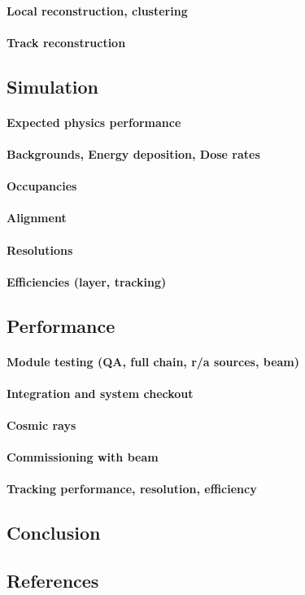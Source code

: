 \paragraph{Local reconstruction, clustering}
\paragraph{Track reconstruction}
\subsection{Simulation}
\paragraph{Expected physics performance}
\paragraph{Backgrounds, Energy deposition, Dose rates}
\paragraph{Occupancies}
\paragraph{Alignment}
\paragraph{Resolutions}
\paragraph{Efficiencies (layer, tracking)}
\subsection{Performance}
\paragraph{Module testing (QA, full chain, r/a sources, beam)}
\paragraph{Integration and system checkout}
\paragraph{Cosmic rays}
\paragraph{Commissioning with beam}
\paragraph{Tracking performance, resolution, efficiency}
\subsection{Conclusion}
\subsection{References}

